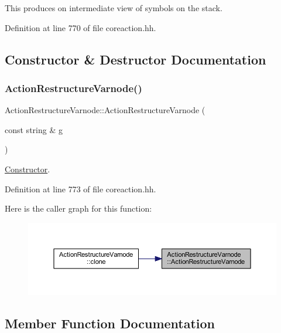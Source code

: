 This produces on intermediate view of symbols on the stack. 

Definition at line 770 of file coreaction.\+hh.



\subsection{Constructor \& Destructor Documentation}
\mbox{\label{class_action_restructure_varnode_a3a01a62b2d1e74cc2b55c5fb89d2609a}} 
\subsubsection{\texorpdfstring{ActionRestructureVarnode()}{ActionRestructureVarnode()}}
{\footnotesize\ttfamily Action\+Restructure\+Varnode\+::\+Action\+Restructure\+Varnode (\begin{DoxyParamCaption}\item[{const string \&}]{g }\end{DoxyParamCaption})\hspace{0.3cm}{\ttfamily [inline]}}



\mbox{\hyperlink{class_constructor}{Constructor}}. 



Definition at line 773 of file coreaction.\+hh.

Here is the caller graph for this function\+:
\nopagebreak
\begin{figure}[H]
\begin{center}
\leavevmode
\includegraphics[width=350pt]{class_action_restructure_varnode_a3a01a62b2d1e74cc2b55c5fb89d2609a_icgraph}
\end{center}
\end{figure}


\subsection{Member Function Documentation}
\mbox{\label{class_action_restructure_varnode_ae2fc4e8dada82bfc532f072aebeb1a73}} 
